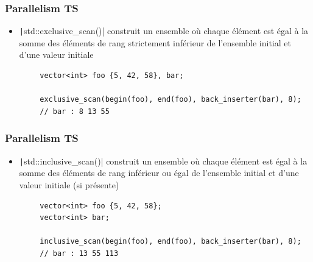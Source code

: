 \documentclass[C++.tex]{subfiles}
\begin{document}
\begin{frame}[fragile]
	\frametitle{Parallelism TS}
	\begin{itemize}
		\item \texttt|std::exclusive_scan()| construit un ensemble où chaque élément est égal à la somme des éléments de rang strictement inférieur de l'ensemble initial et d'une valeur initiale
	\end{itemize}

	\begin{verbatim}
		vector<int> foo {5, 42, 58}, bar;

		exclusive_scan(begin(foo), end(foo), back_inserter(bar), 8);
		// bar : 8 13 55
	\end{verbatim}
\end{frame}

\begin{frame}[fragile]
	\frametitle{Parallelism TS}
	\begin{itemize}
		\item \texttt|std::inclusive_scan()| construit un ensemble où chaque élément est égal à la somme des éléments de rang inférieur ou égal de l'ensemble initial et d'une valeur initiale (si présente)
	\end{itemize}

	\begin{verbatim}
		vector<int> foo {5, 42, 58};
		vector<int> bar;

		inclusive_scan(begin(foo), end(foo), back_inserter(bar), 8);
		// bar : 13 55 113
	\end{verbatim}

\end{frame}
\end{document}
